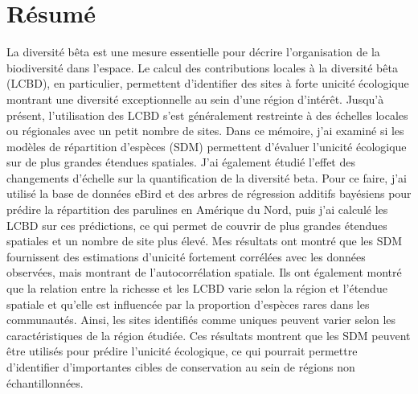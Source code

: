 \documentclass[12pt,twoside,maitrise]{template/dms}
\begin{document}
\maketitle

\maketitle


\francais

\chapter*{Résumé}

La diversité bêta est une mesure essentielle pour décrire l'organisation de la biodiversité dans l'espace. Le calcul des contributions locales à la diversité bêta (LCBD), en particulier, permettent d'identifier des sites à forte unicité écologique montrant une diversité exceptionnelle au sein d'une région d'intérêt. Jusqu’à présent, l'utilisation des LCBD s'est généralement restreinte à des échelles locales ou régionales avec un petit nombre de sites. Dans ce mémoire, j'ai examiné si les modèles de répartition d'espèces (SDM) permettent d'évaluer l'unicité écologique sur de plus grandes étendues spatiales. J'ai également étudié l’effet des changements d’échelle sur la quantification de la diversité beta. Pour ce faire, j'ai utilisé la base de données eBird et des arbres de régression additifs bayésiens pour prédire la répartition des parulines en Amérique du Nord, puis j'ai calculé les LCBD sur ces prédictions, ce qui permet de couvrir de plus grandes étendues spatiales et un nombre de site plus élevé.  Mes résultats ont montré que les SDM fournissent des estimations d'unicité fortement corrélées avec les données observées, mais montrant de l'autocorrélation spatiale. Ils ont également montré que la relation entre la richesse et les LCBD varie selon la région et l'étendue spatiale et qu'elle est influencée par la proportion d'espèces rares dans les communautés. Ainsi, les sites identifiés comme uniques peuvent varier selon les caractéristiques de la région étudiée. Ces résultats montrent que les SDM peuvent être utilisés pour prédire l'unicité écologique, ce qui pourrait permettre d'identifier d'importantes cibles de conservation au sein de régions non échantillonnées.
\end{document}
